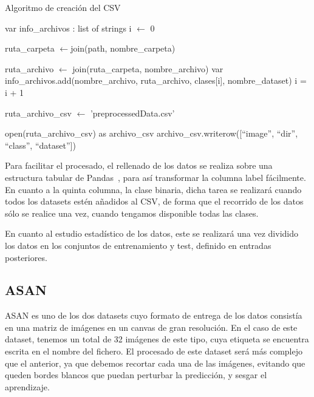 \begin{algorithm}[H]
		\caption{Algoritmo de creación del CSV}
		\label{isiccrear}
		\begin{algorithmic}[1]
			
		 \State var info\_archivos : list of strings
		 \State i  $\gets$ 0
		
			\State ruta\_carpeta $\gets$join(path, nombre\_carpeta)
			
		
						  \State ruta\_archivo $\gets$ join(ruta\_carpeta, nombre\_archivo)
						\State var info\_archivos.add(nombre\_archivo, ruta\_archivo, clases[i], nombre\_dataset)
					\EndIf
					\State i = i + 1
				\EndFor
		 	\EndIf
		\EndFor		
		
	
		\State ruta\_archivo\_csv $\gets$ 'preprocessedData.csv'	
		
		\State open(ruta\_archivo\_csv) as archivo\_csv
		 \State archivo\_csv.writerow([``image'', ``dir'', ``class'', ``dataset''])  
		 
		 \EndProcedure
	\end{algorithmic}
\end{algorithm}

Para facilitar el procesado, el rellenado de los datos se realiza sobre una estructura tabular de Pandas~\cite{reback2020pandas}, para así transformar la columna label fácilmente.
En cuanto a la quinta columna, la clase binaria, dicha tarea se realizará cuando todos los datasets estén añadidos al CSV, de forma que el recorrido de los datos sólo se realice una vez, cuando tengamos disponible todas las clases. 

En cuanto al estudio estadístico de los datos, este se realizará una vez dividido los datos en los conjuntos de entrenamiento y test, definido en entradas posteriores.

\subsection{ASAN}

ASAN es uno de los dos datasets cuyo formato de entrega de los datos consistía en una matriz de imágenes en un canvas de gran resolución. En el caso de este dataset, tenemos un total de 32 imágenes de este tipo, cuya etiqueta se encuentra escrita en el nombre del fichero.
El procesado de este dataset será más complejo que el anterior, ya que debemos recortar cada una de las imágenes, evitando que queden bordes blancos que puedan perturbar la predicción, y sesgar el aprendizaje.

